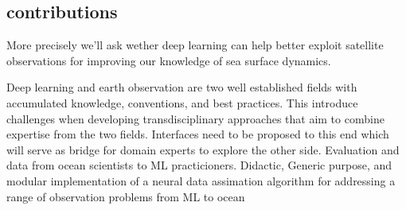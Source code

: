\begin{bibunit}



\subsection{contributions}
More precisely we'll ask wether deep learning can help better exploit satellite observations for improving our knowledge of sea surface dynamics.


Deep learning and earth observation are two well established fields with accumulated knowledge, conventions, and best practices. 
This introduce challenges when developing transdisciplinary approaches that aim to combine expertise from the two fields.
Interfaces need to be proposed to this end which will serve as bridge for domain experts to explore the other side.
Evaluation and data from ocean scientists to ML practicioners. 
Didactic, Generic purpose, and modular implementation of a neural data assimation algorithm for addressing a range of observation problems from ML to ocean



\end{bibunit}


